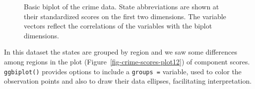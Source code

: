 \documentclass[
  letterpaper,
  10pt,
  krantz2]{krantz}
\makeatletter
\newenvironment{Shaded}{\begin{snugshade}}{\end{snugshade}}
\newcommand{\AttributeTok}[1]{\textcolor[rgb]{0.40,0.45,0.13}{#1}}
\newcommand{\ConstantTok}[1]{\textcolor[rgb]{0.56,0.35,0.01}{#1}}
\newcommand{\DecValTok}[1]{\textcolor[rgb]{0.68,0.00,0.00}{#1}}
\newcommand{\FloatTok}[1]{\textcolor[rgb]{0.68,0.00,0.00}{#1}}
\newcommand{\FunctionTok}[1]{\textcolor[rgb]{0.28,0.35,0.67}{#1}}
\newcommand{\NormalTok}[1]{\textcolor[rgb]{0.00,0.23,0.31}{#1}}
\newcommand{\SpecialCharTok}[1]{\textcolor[rgb]{0.37,0.37,0.37}{#1}}
\newcommand{\StringTok}[1]{\textcolor[rgb]{0.13,0.47,0.30}{#1}}
\newenvironment{kframe}{%
  \medskip{}
  \setlength{\fboxsep}{.8em}
  \def\at@end@of@kframe{}%
  \ifinner\ifhmode%
  \def\at@end@of@kframe{\end{minipage}}%
  \begin{minipage}{\columnwidth}%
  \fi\fi%
  \def\FrameCommand##1{\hskip\@totalleftmargin \hskip-\fboxsep
  \colorbox{shadecolor}{##1}\hskip-\fboxsep
      \hskip-\linewidth \hskip-\@totalleftmargin \hskip\columnwidth}%
  \MakeFramed {\advance\hsize-\width
    \@totalleftmargin\z@ \linewidth\hsize
    \@setminipage}}%
{\par\unskip\endMakeFramed%
  \at@end@of@kframe}
\renewenvironment{Shaded}{\begin{kframe}}{\end{kframe}}
\makeatother
\begin{document}
\begin{figure}[H]


\caption{\label{fig-crime-biplot1}Basic biplot of the crime data. State
abbreviations are shown at their standardized scores on the first two
dimensions. The variable vectors reflect the correlations of the
variables with the biplot dimensions.}

\end{figure}%

In this dataset the states are grouped by region and we saw some
differences among regions in the plot
(Figure~\ref{fig-crime-scores-plot12}) of component scores.
\texttt{ggbiplot()} provides options to include a \texttt{groups\ =}
variable, used to color the observation points and also to draw their
data ellipses, facilitating interpretation.

\begin{Shaded}
\end{Shaded}
\end{document}
